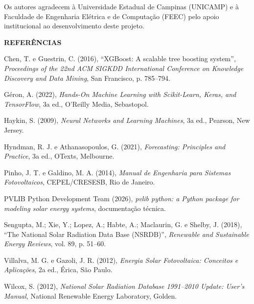 \documentclass[12pt,a4paper]{article}
\begin{document}
Os autores agradecem à Universidade Estadual de Campinas (UNICAMP) e à Faculdade de Engenharia Elétrica e de Computação (FEEC) pelo apoio institucional ao desenvolvimento deste projeto.

\vspace{12pt}

\noindent\textbf{REFERÊNCIAS}

\vspace{6pt}

\noindent Chen, T. e Guestrin, C. (2016), ``XGBoost: A scalable tree boosting system'', \textit{Proceedings of the 22nd ACM SIGKDD International Conference on Knowledge Discovery and Data Mining}, San Francisco, p. 785--794.

\vspace{6pt}

\noindent Géron, A. (2022), \textit{Hands-On Machine Learning with Scikit-Learn, Keras, and TensorFlow}, 3a ed., O'Reilly Media, Sebastopol.

\vspace{6pt}

\noindent Haykin, S. (2009), \textit{Neural Networks and Learning Machines}, 3a ed., Pearson, New Jersey.

\vspace{6pt}

\noindent Hyndman, R. J. e Athanasopoulos, G. (2021), \textit{Forecasting: Principles and Practice}, 3a ed., OTexts, Melbourne.

\vspace{6pt}

\noindent Pinho, J. T. e Galdino, M. A. (2014), \textit{Manual de Engenharia para Sistemas Fotovoltaicos}, CEPEL/CRESESB, Rio de Janeiro.

\vspace{6pt}

\noindent PVLIB Python Development Team (2026), \textit{pvlib python: a Python package for modeling solar energy systems}, documentação técnica.

\vspace{6pt}

\noindent Sengupta, M.; Xie, Y.; Lopez, A.; Habte, A.; Maclaurin, G. e Shelby, J. (2018), ``The National Solar Radiation Data Base (NSRDB)'', \textit{Renewable and Sustainable Energy Reviews}, vol. 89, p. 51--60.

\vspace{6pt}

\noindent Villalva, M. G. e Gazoli, J. R. (2012), \textit{Energia Solar Fotovoltaica: Conceitos e Aplicações}, 2a ed., Érica, São Paulo.

\vspace{6pt}

\noindent Wilcox, S. (2012), \textit{National Solar Radiation Database 1991--2010 Update: User's Manual}, National Renewable Energy Laboratory, Golden.
\end{document}
